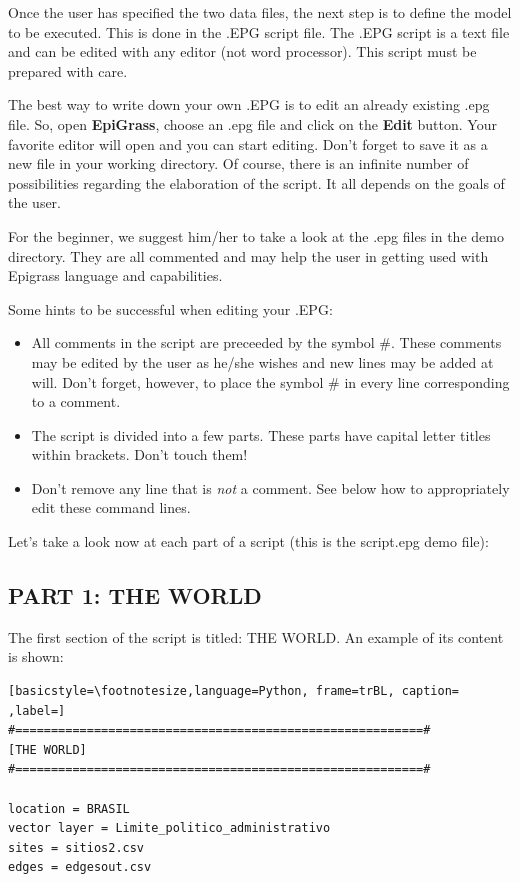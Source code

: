 Once the user has specified the two data files, the next step is to define the model to be executed. This is done in the .EPG script file. The .EPG script is a text file and can be edited with any editor (not word processor). This script must be prepared with care. 

The best way to write down your own .EPG is to edit an already existing .epg file. So, open \textbf{EpiGrass}, choose an .epg file and click on the \textbf{Edit} button. Your favorite editor will open and you can start editing. Don't forget to save it as a new file in your working directory. Of course, there is an infinite number of possibilities regarding the elaboration of the script. It all depends on the goals of the user. 

For the beginner, we suggest him/her to take a look at the .epg files in the demo directory. They are all commented and may help the user in getting used with Epigrass language and capabilities.

Some hints to be successful when editing your .EPG:

\begin{itemize}
\item  All comments in the script are preceeded by the symbol \#. These comments may be edited by the user as he/she wishes and new lines may be added at will. Don't forget, however, to place the symbol \# in every line corresponding to a comment.
\item The script is divided into a few parts. These parts have capital letter titles within brackets. Don't touch them!
\item Don't remove any line that is \textit{not} a comment. See below how to appropriately edit these command lines. 
\end{itemize}

Let's take a look now at each part of a script (this is the script.epg demo file):

\subsection{PART 1: THE WORLD}

The first section of the script is titled: THE WORLD. An example of its content is shown:
 
\begin{lstlisting}[basicstyle=\footnotesize,language=Python, frame=trBL, caption= ,label=]
#=========================================================#
[THE WORLD]
#=========================================================#

location = BRASIL
vector layer = Limite_politico_administrativo
sites = sitios2.csv
edges = edgesout.csv
\end{lstlisting}

